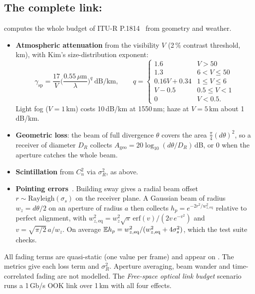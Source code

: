 \subsection{The complete link: }
 computes the whole budget of ITU-R P.1814~\cite{p1814} from geometry and weather.
\begin{itemize}
  \item \textbf{Atmospheric attenuation} from the visibility $V$ (2\,\% contrast threshold, km),
  with Kim's size-distribution exponent:
  \begin{equation}
    \gamma_{\mathrm{sp}}=\frac{17}{V}\Big(\frac{0.55\,\mu\mathrm m}{\lambda}\Big)^{q}\ \mathrm{dB/km},\qquad
    q=\begin{cases}1.6 & V>50\\ 1.3 & 6<V\le50\\ 0.16V+0.34 & 1\le V\le6\\ V-0.5 & 0.5\le V<1\\ 0 & V<0.5 .\end{cases}
  \end{equation}
  Light fog ($V=1$\,km) costs 10\,dB/km at 1550\,nm; haze at $V=5$\,km about 1\,dB/km.
  \item \textbf{Geometric loss}: the beam of full divergence $\theta$ covers the area
  $\frac\pi4(d\theta)^2$, so a receiver of diameter $D_R$ collects
  $A_{\mathrm{geo}}=20\log_{10}(d\theta/D_R)$\,dB, or 0 when the aperture catches the whole beam.
  \item \textbf{Scintillation} from $C_n^2$ via $\sigma_R^2$, as above.
  \item \textbf{Pointing errors}~\cite{farid2007}. Building sway gives a radial beam offset
  $r\sim\mathrm{Rayleigh}(\sigma_s)$ on the receiver plane. A Gaussian beam of radius
  $w_z=d\theta/2$ on an aperture of radius $a$ then collects
  $h_p=e^{-2r^2/w_{z,\mathrm{eq}}^2}$ relative to perfect alignment, with
  $w_{z,\mathrm{eq}}^2=w_z^2\sqrt\pi\,\mathrm{erf}(v)/(2v\,e^{-v^2})$ and $v=\sqrt{\pi/2}\,a/w_z$. On
  average $\mathbb{E} h_p=w_{z,\mathrm{eq}}^2/(w_{z,\mathrm{eq}}^2+4\sigma_s^2)$, which the test suite checks.
\end{itemize}
All fading terms are quasi-static (one value per frame) and appear on . The metrics give
each loss term and $\sigma_R^2$. Aperture averaging, beam wander and time-correlated fading are not
modelled. The \emph{Free-space optical link budget} scenario runs a 1\,Gb/s OOK link over 1\,km
with all four effects.


